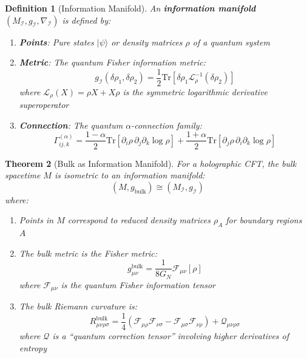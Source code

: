 \documentclass[12pt,a4paper]{article}
\newtheorem{theorem}{Theorem}[section]
\newtheorem{definition}[theorem]{Definition}
\begin{document}
\begin{definition}[Information Manifold]\label{def:info-manifold}
An \textbf{information manifold} $(M_{\mathcal{I}}, g_{\mathcal{I}}, \nabla_{\mathcal{I}})$ is defined by:
\begin{enumerate}
    \item \textbf{Points}: Pure states $|\psi\rangle$ or density matrices $\rho$ of a quantum system
    \item \textbf{Metric}: The quantum Fisher information metric:
    \begin{equation}
    g_{\mathcal{I}}(\delta\rho_1, \delta\rho_2) = \frac{1}{2} \text{Tr}[\delta\rho_1 \mathcal{L}_\rho^{-1}(\delta\rho_2)]
    \end{equation}
    where $\mathcal{L}_\rho(X) = \rho X + X \rho$ is the symmetric logarithmic derivative superoperator
    \item \textbf{Connection}: The quantum $\alpha$-connection family:
    \begin{equation}
    \Gamma^{(\alpha)}_{ij,k} = \frac{1-\alpha}{2} \text{Tr}[\partial_i\rho \, \partial_j\partial_k \log\rho] + \frac{1+\alpha}{2} \text{Tr}[\partial_j\rho \, \partial_i\partial_k \log\rho]
    \end{equation}
\end{enumerate}
\end{definition}

\begin{theorem}[Bulk as Information Manifold]\label{thm:bulk-info-manifold}
For a holographic CFT, the bulk spacetime $M$ is isometric to an information manifold:
\begin{equation}
(M, g_{\text{bulk}}) \cong (M_{\mathcal{I}}, g_{\mathcal{I}})
\end{equation}
where:
\begin{enumerate}
    \item Points in $M$ correspond to reduced density matrices $\rho_A$ for boundary regions $A$
    \item The bulk metric is the Fisher metric:
    \begin{equation}
    g_{\mu\nu}^{\text{bulk}} = \frac{1}{8G_N} \mathcal{F}_{\mu\nu}[\rho]
    \end{equation}
    where $\mathcal{F}_{\mu\nu}$ is the quantum Fisher information tensor
    \item The bulk Riemann curvature is:
    \begin{equation}
    R_{\mu\nu\rho\sigma}^{\text{bulk}} = \frac{1}{4} \left( \mathcal{F}_{\mu\rho} \mathcal{F}_{\nu\sigma} - \mathcal{F}_{\mu\sigma} \mathcal{F}_{\nu\rho} \right) + \mathcal{Q}_{\mu\nu\rho\sigma}
    \end{equation}
    where $\mathcal{Q}$ is a ``quantum correction tensor'' involving higher derivatives of entropy
\end{enumerate}
\end{theorem}
\end{document}
